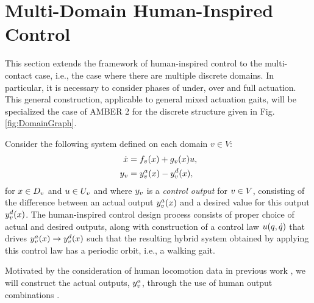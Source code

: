 \section{Multi-Domain Human-Inspired Control}
\label{sec:control}

This section extends the framework of human-inspired control \cite{Ames11} to the multi-contact case, i.e., 
the case where there are multiple discrete domains.  In particular, it is necessary to consider phases of under, over and full actuation.  
This general construction, applicable to general mixed actuation gaits, will be specialized the case of AMBER 2 
for the discrete structure given in Fig. \ref{fig:DomainGraph}.  




Consider the following system defined on each domain $v \in V$:
\begin{align}
\dot {x} &= f_v(x) + g_v (x) u,\\
y_v &= y^a_v(x) - y^d_v(x),
\end{align}
for $x \in D_v$ and $u \in U_v$ and where $y_v $ is a \textit{control output} for $v \in V$, consisting of the difference between an actual output $y^a_v(x)$ and a desired value for this output $y^d_v(x)$. The human-inspired control design process consists of proper choice of actual and desired outputs, along with construction of a control law $u(q,\dot {q})$ that drives $y^a_v(x) \to y^d_v(x)$ such that the resulting hybrid system obtained by applying this control law has a periodic orbit, i.e., a walking gait. 

Motivated by the consideration of human locomotion data in previous work \cite{AVB:HSCC:11}, we will construct the actual outputs, $y^a_v$, through the use of human output combinations \cite{Ames:TAC:2012}. 

